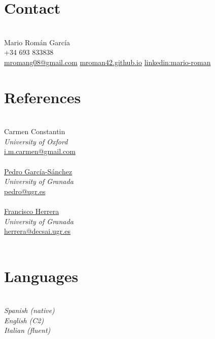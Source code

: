 \documentclass[nocolors]{friggeri-cv-a4}
\begin{document}

\begin{aside} %
  \section{Contact}\\
  Mario Román García\\
+34 693 833838\\
\href{mailto:mromang08@gmail.com}{mromang08@gmail.com}
\href{https://mroman42.github.io}{mroman42.github.io}
\href{https://www.linkedin.com/in/mario-roman}{linkedin:mario-roman}
\section{References}\\
Carmen Constantin\\
\textit{University of Oxford}\\
\href{mailto:i.m.carmen@gmail.com}{i.m.carmen@gmail.com}\\
\quad\\
\href{https://scholar.google.com/citations?user=gvq9UmMAAAAJ&hl=en&oi=ao}{Pedro García-Sánchez}\\
\textit{University of Granada}\\
\href{mailto:pedro@ugr.es}{pedro@ugr.es}\\
\quad\\
\href{https://scholar.google.com/citations?user=HULIk-QAAAAJ&hl=en&oi=sra}{Francisco Herrera}\\
\textit{University of Granada}\\
\href{mailto:herrera@decsai.ugr.es}{herrera@decsai.ugr.es}\\
\quad\\



\section{Languages}\\
\textit{Spanish (native)\\
English (C2) \\
Italian (fluent)}

\end{aside}
\end{document}
